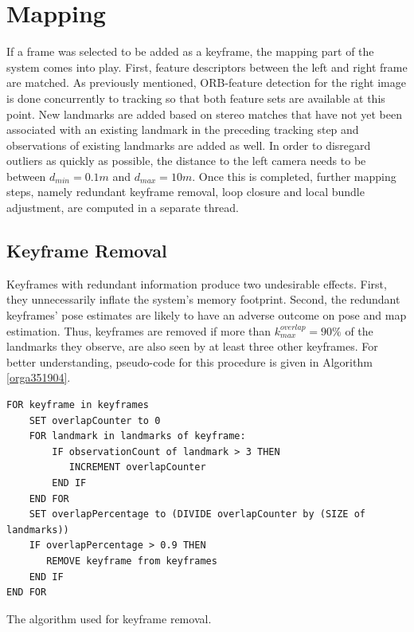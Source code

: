 \documentclass[a4paper, 10pt]{article}
\begin{document}
\section{Mapping}
\label{sec:org8eb8273}
If a frame was selected to be added as a keyframe, the mapping part of the system comes into play. First, feature descriptors between the left and right frame are matched. 
As previously mentioned, ORB-feature detection for the right image is done concurrently to tracking so that both feature sets are available at this point. 
New landmarks are added based on stereo matches that have not yet been associated with an existing landmark in the preceding tracking step and observations of existing landmarks are added as well. 
In order to disregard outliers as quickly as possible, the distance to the left camera needs to be between \(d_{min}=0.1m\) and \(d_{max}=10m\).
Once this is completed, further mapping steps, namely redundant keyframe removal, loop closure and local bundle adjustment, are computed in a separate thread.

\subsection{Keyframe Removal}
\label{sec:orgf86bb38}
Keyframes with redundant information produce two undesirable effects. First, they unnecessarily inflate the system’s memory footprint. Second, the redundant keyframes' pose estimates are 
likely to have an adverse outcome on pose and map estimation.
Thus, keyframes are removed if more than \(k_{max}^{overlap}=90\%\) of the landmarks they observe, are also seen by at least three other keyframes. For better understanding, pseudo-code for this procedure 
is given in Algorithm \ref{orga351904}.

\begin{listing}
\begin{verbatim}
FOR keyframe in keyframes
    SET overlapCounter to 0
    FOR landmark in landmarks of keyframe:
        IF observationCount of landmark > 3 THEN
           INCREMENT overlapCounter
        END IF
    END FOR
    SET overlapPercentage to (DIVIDE overlapCounter by (SIZE of landmarks))
    IF overlapPercentage > 0.9 THEN
       REMOVE keyframe from keyframes
    END IF
END FOR
\end{verbatim}
\caption{\label{orga351904}
The algorithm used for keyframe removal.}
\end{listing}
\end{document}
